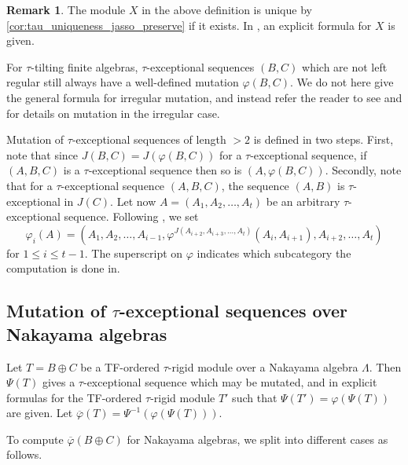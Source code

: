 \documentclass[11pt]{amsart}
\theoremstyle{definition}
\newtheorem{remark}[theorem]{Remark}
\begin{document}
\begin{remark}
    The module $X$ in the above definition is unique by \cref{cor:tau_uniqueness_jasso_preserve} if it exists. In \cite[Def.-Prop. 4.3]{BHM2024}, an explicit formula for $X$ is given.
\end{remark}

For $\tau$-tilting finite algebras, $\tau$-exceptional sequences $(B,C)$ which are not left regular still always have a well-defined mutation $\varphi(B,C)$. We do not here give the general formula for irregular mutation, and instead refer the reader to see \cite[Sec. 3.3]{BHM2024} and \cite[Def. 3.23]{bkt} for details on mutation in the irregular case. 


Mutation of $\tau$-exceptional sequences of length $>2$ is defined in two steps. First, note that since $J(B,C) = J(\varphi(B,C))$ for a $\tau$-exceptional sequence, if $(A,B,C)$ is a $\tau$-exceptional sequence then so is $(A,\varphi(B,C))$. Secondly, note that for a $\tau$-exceptional sequence $(A,B,C)$, the sequence $(A,B)$ is $\tau$-exceptional in $J(C)$. Let now $A = (A_1,A_2,\dots,A_t)$ be an arbitrary $\tau$-exceptional sequence. Following \cite[Def. 5.2]{BHM2024}, we set \[\varphi_i(A) = (A_1,A_2,\dots,A_{i-1},\varphi^{J(A_{i+2},A_{i+3},\dots,A_t)}(A_i,A_{i+1}),A_{i+2},\dots,A_t)\] for $1 \leq i \leq t-1$. The superscript on $\varphi$ indicates which subcategory the computation is done in.


\subsection{Mutation of $\tau$-exceptional sequences over Nakayama algebras}
Let $T = B \oplus C$ be a TF-ordered $\tau$-rigid module over a Nakayama algebra $\Lambda$. Then $\Psi(T)$ gives a $\tau$-exceptional sequence which may be mutated, and in \cite{bkt} explicit formulas for the TF-ordered $\tau$-rigid module $T'$ such that $\Psi(T') = \varphi(\Psi(T))$ are given. Let $\overline{\varphi}(T) = \Psi^{-1}(\varphi(\Psi(T)))$. 

To compute $\overline{\varphi}(B \oplus C)$ for Nakayama algebras, we split into different cases as follows.
\end{document}
